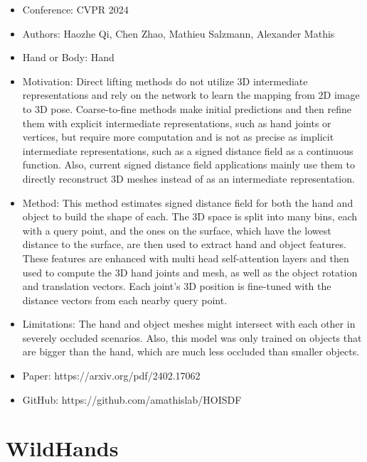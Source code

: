 \documentclass{article}
\begin{document}
\begin{itemize}
    \item Conference: CVPR 2024
    \item Authors: Haozhe Qi, Chen Zhao, Mathieu Salzmann, Alexander Mathis
    \item Hand or Body: Hand
    \item Motivation: Direct lifting methods do not utilize 3D intermediate representations and rely on the network to learn the mapping from 2D image to 3D pose. Coarse-to-fine methods make initial predictions and then refine them with explicit intermediate representations, such as hand joints or vertices, but require more computation and is not as precise as implicit intermediate representations, such as a signed distance field as a continuous function. Also, current signed distance field applications mainly use them to directly reconstruct 3D meshes instead of as an intermediate representation.
    \item Method: This method estimates signed distance field for both the hand and object to build the shape of each. The 3D space is split into many bins, each with a query point, and the ones on the surface, which have the lowest distance to the surface, are then used to extract hand and object features. These features are enhanced with multi head self-attention layers and then used to compute the 3D hand joints and mesh, as well as the object rotation and translation vectors. Each joint's 3D position is fine-tuned with the distance vectors from each nearby query point.
    \item Limitations: The hand and object meshes might intersect with each other in severely occluded scenarios. Also, this model was only trained on objects that are bigger than the hand, which are much less occluded than smaller objects.
    \item Paper: https://arxiv.org/pdf/2402.17062
    \item GitHub: https://github.com/amathislab/HOISDF
\end{itemize}

\section*{WildHands}
\end{document}

